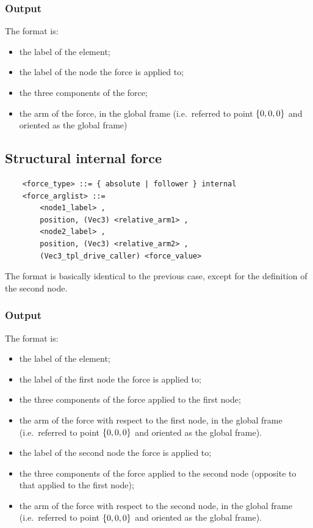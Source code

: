 \subsubsection{Output}
The format is:
\begin{itemize}
    \item the label of the element;
    \item the label of the node the force is applied to;
    \item the three components of the force;
    \item the arm of the force, in the global frame (i.e.\ referred
          to point $ \left\{ 0,0,0 \right\} $ and oriented as the global frame)
\end{itemize}

\subsection{Structural internal force}
\label{sec:EL:FORCE:STRUCTURAL:INTERNAL_FORCE}
\begin{verbatim}
    <force_type> ::= { absolute | follower } internal
    <force_arglist> ::=
        <node1_label> , 
        position, (Vec3) <relative_arm1> ,
        <node2_label> ,
        position, (Vec3) <relative_arm2> ,
        (Vec3_tpl_drive_caller) <force_value>
\end{verbatim}
The format is basically identical to the previous case,
except for the definition of the second node.

\subsubsection{Output}
The format is:
\begin{itemize}
    \item the label of the element;
    \item the label of the first node the force is applied to;
    \item the three components of the force applied to the first node;
    \item the arm of the force with respect to the first node,
	  in the global frame (i.e.\ referred to point $ \left\{ 0,0,0 \right\} $
	  and oriented as the global frame).
    \item the label of the second node the force is applied to;
    \item the three components of the force applied to the second node
	  (opposite to that applied to the first node);
    \item the arm of the force with respect to the second node,
	  in the global frame (i.e.\ referred to point $ \left\{ 0,0,0 \right\} $
	  and oriented as the global frame).
\end{itemize}

